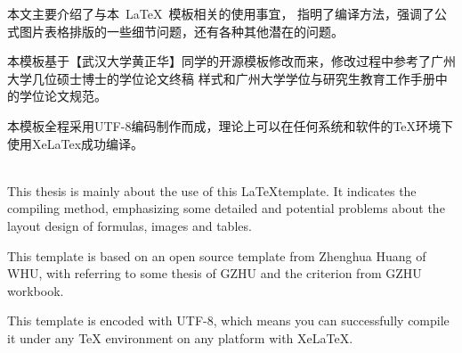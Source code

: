 \renewcommand{\baselinestretch}{1.5}  %

\begin{cnabstract}
本文主要介绍了与本~\LaTeX~模板相关的使用事宜，
指明了编译方法，强调了公式图片表格排版的一些细节问题，还有各种其他潜在的问题。
\par
本模板基于【武汉大学黄正华】同学的开源模板修改而来，修改过程中参考了广州大学几位硕士博士的学位论文终稿
样式和广州大学学位与研究生教育工作手册中的学位论文规范。
\par
本模板全程采用UTF-8编码制作而成，理论上可以在任何系统和软件的TeX环境下使用XeLaTex成功编译。
\\\\
\end{cnabstract}

\begin{enabstract}
This thesis is mainly about the use of this \LaTeX template. It indicates the compiling method, emphasizing 
some detailed and potential problems about the layout design of formulas, images and tables.
\par
This template is based on an open source template from Zhenghua Huang of WHU, with referring to some 
thesis of GZHU and the criterion from GZHU workbook.  
\par
This template is encoded with UTF-8, which means you can successfully compile it under any 
TeX environment on any platform with XeLaTeX.
\\\\
\end{enabstract}
